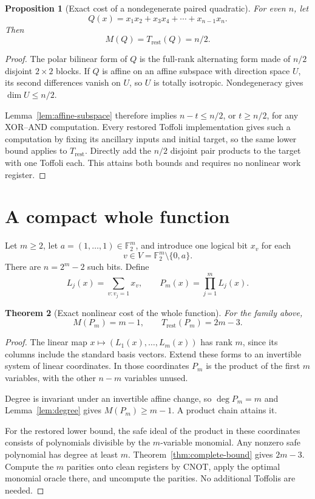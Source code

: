 \documentclass[11pt,letterpaper,oneside]{report}
\theoremstyle{komorebi}
\newtheorem{theorem}{Theorem}[chapter]
\newtheorem{proposition}[theorem]{Proposition}
\newcommand{\F}{\mathbb F_2}
\newcommand{\KTrest}{T_{\mathrm{rest}}}
\begin{document}
\begin{proposition}[Exact cost of a nondegenerate paired quadratic]\label{prop:quadratic-cost}
For even $n$, let
\[
 Q(x)=x_1x_2+x_3x_4+\cdots+x_{n-1}x_n.
\]
Then
\[
 M(Q)=\KTrest(Q)=n/2.
\]
\end{proposition}
\begin{proof}
The polar bilinear form of $Q$ is the full-rank alternating form made of $n/2$ disjoint $2\times2$ blocks. If $Q$ is affine on an affine subspace with direction space $U$, its second differences vanish on $U$, so $U$ is totally isotropic. Nondegeneracy gives $\dim U\le n/2$.

Lemma~\ref{lem:affine-subspace} therefore implies $n-t\le n/2$, or $t\ge n/2$, for any XOR--AND computation. Every restored Toffoli implementation gives such a computation by fixing its ancillary inputs and initial target, so the same lower bound applies to $\KTrest$. Directly add the $n/2$ disjoint pair products to the target with one Toffoli each. This attains both bounds and requires no nonlinear work register.
\end{proof}

\section{A compact whole function}
Let $m\ge2$, let $a=(1,\ldots,1)\in\F^m$, and introduce one logical bit $x_v$ for each
\[
 v\in V=\F^m\setminus\{0,a\}.
\]
There are $n=2^m-2$ such bits. Define
\[
 L_j(x)=\sum_{v:v_j=1}x_v,\qquad
 P_m(x)=\prod_{j=1}^mL_j(x).
\]

\begin{theorem}[Exact nonlinear cost of the whole function]\label{thm:whole-cost}
For the family above,
\[
 M(P_m)=m-1,\qquad\KTrest(P_m)=2m-3.
\]
\end{theorem}
\begin{proof}
The linear map $x\mapsto(L_1(x),\ldots,L_m(x))$ has rank $m$, since its columns include the standard basis vectors. Extend these forms to an invertible system of linear coordinates. In those coordinates $P_m$ is the product of the first $m$ variables, with the other $n-m$ variables unused.

Degree is invariant under an invertible affine change, so $\deg P_m=m$ and Lemma~\ref{lem:degree} gives $M(P_m)\ge m-1$. A product chain attains it.

For the restored lower bound, the safe ideal of the product in these coordinates consists of polynomials divisible by the $m$-variable monomial. Any nonzero safe polynomial has degree at least $m$. Theorem~\ref{thm:complete-bound} gives $2m-3$. Compute the $m$ parities onto clean registers by CNOT, apply the optimal monomial oracle there, and uncompute the parities. No additional Toffolis are needed.
\end{proof}
\end{document}
